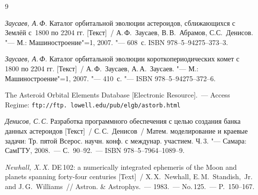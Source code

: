 \begin{thebibliography}{9}





 \textit{Заусаев, А.\,Ф.} Каталог орбитальной эволюции астероидов, сближающихся с Землёй с~1800 по 2204 гг. [Текст]~/ А.\,Ф.~Заусаев, В.\,В.~Абрамов, С.С.~Денисов. "--- М.: Машиностроение"=1, 2007. "--- 608~с. ISBN 978--5--94275--373--3.


 \textit{Заусаев, А.\,Ф.} Каталог орбитальной эволюции короткопериодических комет с 1800 по 2204 гг. [Текст]~/ А.\,Ф.~Заусаев, А.\,А.~Заусаев. "--- М.: Машиностроение"=1, 2007. "--- 410~с. "---  ISBN 978--5--94275--372--6.


 The Asteroid Orbital Elements Database [Electronic Resource].~--- Access Regime: {\tt ftp://ftp. lowell.edu/pub/elgb/astorb.html}%


 \textit{Денисов, С.\,С.} Разработка программного обеспечения с целью создания банка данных астероидов [Текст]~/ С.\,С.~Денисов~/ Матем. моделирование и краевые задачи: Тр. пятой Всерос. научн. конф. с междунар. участием. Ч.\,3. "--- Самара: СамГТУ, 2008.~--- С.~90--92.~--- ISBN 978--5--7964--1089--9.


 \textit{Newhall, X.\,X.} DE\,102: a numerically inte\-gra\-ted ephemeris of the Moon and planets spanning forty-four centuries [Text]~/ X.\,X.~Newhall, E.\,M.~Standish,~Jr. and J.\,G.~Williams~/\!/ Astron. \& Astrophys.~--- 1983.~--- No.\,125.~--- P.~150--167.%





\end{thebibliography}











\makeengtitlem











%


